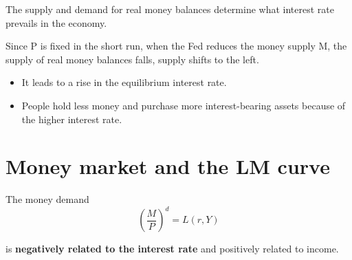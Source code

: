 \documentclass[10pt]{article}
\begin{document}
The supply and demand for real money balances determine what interest rate prevails
in the economy.


\begin{figure}[H]
\end{figure}

Since P is fixed in the short run, when the Fed reduces the money supply M, the supply
of real money balances falls, supply shifts to the left. 
\begin{itemize}
\item It leads to a rise in the equilibrium interest rate.
\item People hold less money and purchase more interest-bearing assets because of the
		higher interest rate.
\end{itemize}



\section{Money market and the LM curve}
The money demand
\begin{equation*}
\left( \frac{M}{P} \right) ^{d} = L(r, Y)
\end{equation*}

is {\textbf {negatively related to the interest rate}} and positively related to income.




\begin{figure}[H]
\end{figure}
\end{document}
